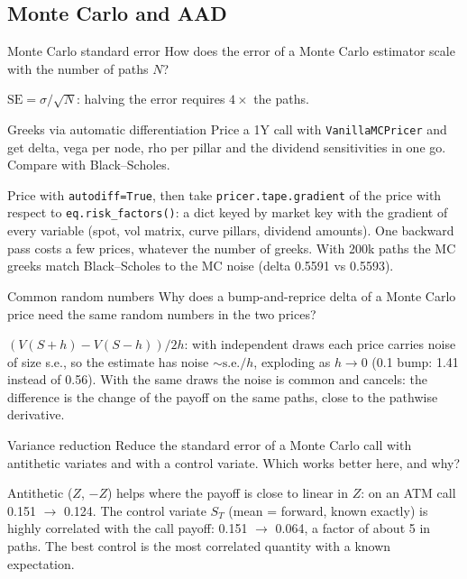\subsection{Monte Carlo and AAD}

\begin{question}{\Theory {}}{Monte Carlo standard error}
How does the error of a Monte Carlo estimator scale with the number of paths $N$?
\end{question}
\begin{answer}
$\mathrm{SE} = \hat\sigma/\sqrt{N}$: halving the error requires $4\times$ the paths.
\end{answer}

\begin{question}{\Practice {}}{Greeks via automatic differentiation}
Price a 1Y call with \texttt{VanillaMCPricer} and get delta, vega per node, rho per pillar and the dividend
sensitivities in one go. Compare with Black--Scholes. 
\end{question}
\begin{answer}
Price with \texttt{autodiff=True}, then take \texttt{pricer.tape.gradient} of the price with respect to
\texttt{eq.risk\_factors()}: a dict keyed by market key with the gradient of every variable (spot, vol matrix, curve
pillars, dividend amounts). One backward pass costs a few prices, whatever the
number of greeks. With 200k paths the MC greeks match Black--Scholes to the MC noise (delta 0.5591 vs 0.5593).
\end{answer}

\begin{question}{\Theory {}}{Common random numbers}
Why does a bump-and-reprice delta of a Monte Carlo price need the same random numbers in the two prices?
\end{question}
\begin{answer}
$(V(S+h) - V(S-h))/2h$: with independent draws each price carries noise of size s.e., so the estimate has noise
$\sim \text{s.e.}/h$, exploding as $h \to 0$ (0.1 bump: 1.41 instead of 0.56). With the same draws the noise is common and
cancels: the difference is the change of the payoff on the same paths, close to the pathwise derivative.
\end{answer}

\begin{question}{\Practice {}}{Variance reduction}
Reduce the standard error of a Monte Carlo call with antithetic variates and with a control variate. Which works
better here, and why? 
\end{question}
\begin{answer}
Antithetic ($Z$, $-Z$) helps where the payoff is close to linear in $Z$: on an ATM call 0.151 $\to$ 0.124. The control
variate $S_T$ (mean = forward, known exactly) is highly correlated with the call payoff: 0.151 $\to$ 0.064, a factor
of about 5 in paths. The best control is the most correlated quantity with a known expectation.
\end{answer}
